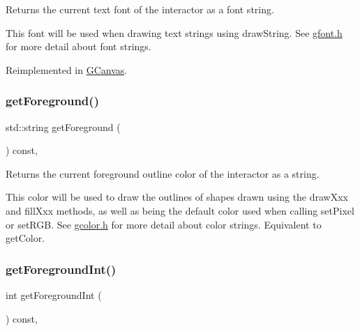 Returns the current text font of the interactor as a font string. 

This font will be used when drawing text strings using draw\+String. See \mbox{\hyperlink{gfont_8h_source}{gfont.\+h}} for more detail about font strings. 

Reimplemented in \mbox{\hyperlink{classGCanvas_a24420d98f18927d2c201a3ab55ffdcec}{G\+Canvas}}.

\mbox{\label{classGDrawingSurface_a4fa2d8b0192a3a5b4af4bbfe71194d03}} 
\subsubsection{\texorpdfstring{get\+Foreground()}{getForeground()}}
{\footnotesize\ttfamily std\+::string get\+Foreground (\begin{DoxyParamCaption}{ }\end{DoxyParamCaption}) const\hspace{0.3cm}{\ttfamily [virtual]}, {\ttfamily [inherited]}}



Returns the current foreground outline color of the interactor as a string. 

This color will be used to draw the outlines of shapes drawn using the draw\+Xxx and fill\+Xxx methods, as well as being the default color used when calling set\+Pixel or set\+R\+GB. See \mbox{\hyperlink{gcolor_8h_source}{gcolor.\+h}} for more detail about color strings. Equivalent to get\+Color. \mbox{\label{classGDrawingSurface_ac3b12ab385a6ef9ae90fc879860ba726}} 
\subsubsection{\texorpdfstring{get\+Foreground\+Int()}{getForegroundInt()}}
{\footnotesize\ttfamily int get\+Foreground\+Int (\begin{DoxyParamCaption}{ }\end{DoxyParamCaption}) const\hspace{0.3cm}{\ttfamily [virtual]}, {\ttfamily [inherited]}}



